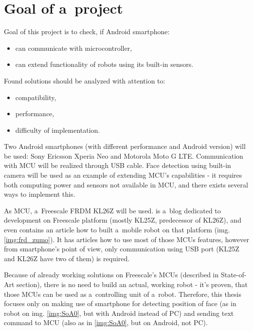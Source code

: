 \section{Goal of a~project}
Goal of this project is to check, if Android smartphone:
\begin{itemize}
  \item can communicate with microcontroller,
  \item can extend functionality of robots using its built-in sensors.
\end{itemize}
Found solutions should be analyzed with attention to:
\begin{itemize}
  \item compatibility,
  \item performance,
  \item difficulty of implementation.
\end{itemize}
Two Android smartphones (with different performance and Android version) will be
used: Sony Ericsson Xperia Neo and Motorola Moto G LTE.
Communication with MCU will be realized through USB cable.
Face detection using built-in camera will be used as an example of extending
MCU's capabilities - it requires both computing power and sensors not available
in MCU, and there exists several ways to implement this.

As MCU, a~Freescale FRDM KL26Z will be used. 
\cite{mcu_on_eclipse} is a~blog dedicated to development on Freescale platform
(mostly KL25Z, predecessor of KL26Z), and even contains an article how to built a~mobile robot on that
platform (img. \ref{img:frd_zumo}).
It has articles how to use most of those MCUs features, however from
smartphone's point of view, only communication using USB port (KL25Z and KL26Z
have two of them) is required.

Because of already working solutions on Freescale's MCUs (described in
State-of-Art section), there is no need to build an actual, working robot - it's
proven, that those MCUs can be used as a~controlling unit of a~robot.
Therefore, this thesis focuses only on making use of smartphone for detecting
position of face (as in robot on img. \ref{img:SoA0}, but with Android instead
of PC) and sending text command to MCU (also as in \ref{img:SoA0}, but on
Android, not PC).

